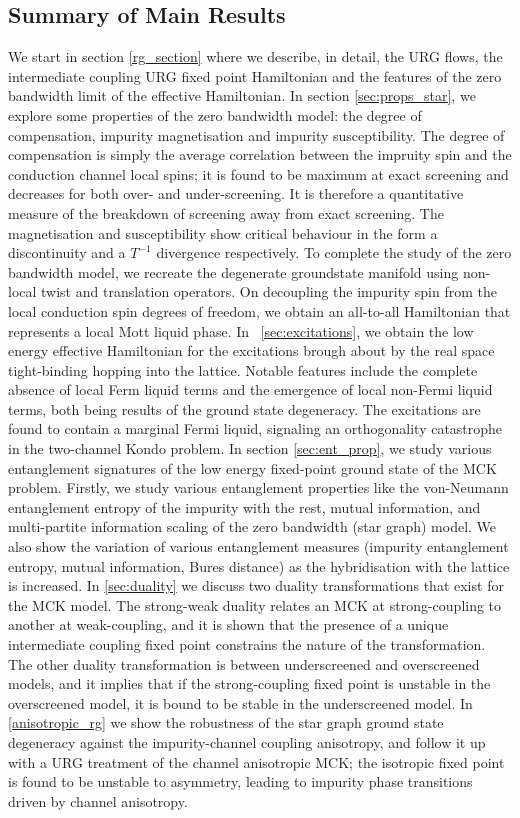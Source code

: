 \documentclass[reprint,prb,superscriptaddress]{revtex4-2}
\begin{document}
\subsection*{Summary of Main Results} 
We start in section \ref{rg_section} where we describe, in detail, the URG flows, the intermediate coupling URG fixed point Hamiltonian and the features of the zero bandwidth limit of the effective Hamiltonian.
In section \ref{sec:props_star}, we explore some properties of the zero bandwidth model: the degree of compensation, impurity magnetisation and impurity susceptibility.
The degree of compensation is simply the average correlation between the impruity spin and the conduction channel local spins; it is found to be maximum at exact screening and decreases for both over- and under-screening.
It is therefore a quantitative measure of the breakdown of screening away from exact screening.
The magnetisation and susceptibility show critical behaviour in the form a discontinuity and a \(T^{-1}\) divergence respectively.
To complete the study of the zero bandwidth model, we recreate the degenerate groundstate manifold using non-local twist and translation operators.
On decoupling the impurity spin from the local conduction spin degrees of freedom, we obtain an all-to-all Hamiltonian that represents a local Mott liquid phase.
In ~\ref{sec:excitations}, we obtain the low energy effective Hamiltonian for the excitations brough about by the real space tight-binding hopping into the lattice.
Notable features include the complete absence of local Ferm liquid terms and the emergence of local non-Fermi liquid terms, both being results of the ground state degeneracy.
The excitations are found to contain a marginal Fermi liquid, signaling an orthogonality catastrophe in the two-channel Kondo problem.
In section \ref{sec:ent_prop}, we study various entanglement signatures of the low energy fixed-point ground state of the MCK problem.
Firstly, we study various entanglement properties like the von-Neumann entanglement entropy of the impurity with the rest, mutual information, and multi-partite information scaling of the zero bandwidth (star graph) model.
We also show the variation of various entanglement measures (impurity entanglement entropy, mutual information, Bures distance) as the hybridisation with the lattice is increased.
In \ref{sec:duality} we discuss two duality transformations that exist for the MCK model.
The strong-weak duality relates an MCK at strong-coupling to another at weak-coupling, and it is shown that the presence of a unique intermediate coupling fixed point constrains the nature of the transformation.
The other duality transformation is between underscreened and overscreened models, and it implies that if the strong-coupling fixed point is unstable in the overscreened model, it is bound to be stable in the underscreened model.
In \ref{anisotropic_rg} we show the robustness of the star graph ground state degeneracy against the impurity-channel coupling anisotropy, and follow it up with a URG treatment of the channel anisotropic MCK; the isotropic fixed point is found to be unstable to asymmetry, leading to impurity phase transitions driven by channel anisotropy.
\end{document}
